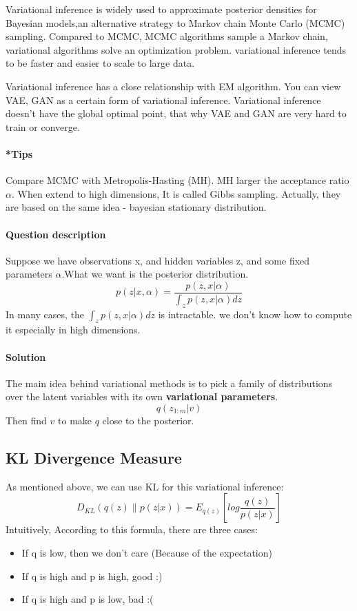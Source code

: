 \documentclass{article}
\begin{document}
Variational inference is widely used to approximate posterior densities for Bayesian models,an alternative strategy to Markov chain Monte Carlo (MCMC) sampling. Compared to MCMC, MCMC algorithms sample a Markov chain, variational algorithms solve an
optimization problem. variational inference tends to be faster and easier to scale to large data.

Variational inference has a close relationship with EM algorithm. You can view VAE, GAN as a certain form of variational inference. Variational inference doesn't have the global optimal point, that why VAE and GAN are very hard to train or converge.
\paragraph{*Tips} Compare MCMC with Metropolis-Hasting (MH). MH larger the acceptance ratio $\alpha$. When extend to high dimensions, It is called Gibbs sampling. Actually, they are based on the same idea - bayesian stationary distribution. 

\paragraph{Question description} Suppose we have observations x, and hidden variables z, and some fixed parameters $\alpha$.What we want is the posterior distribution.
$$p(z|x,\alpha)=\frac{p(z,x|\alpha)}{\int_z p(z,x|\alpha)dz}$$
In many cases, the $\int_z p(z,x|\alpha)dz$ is intractable. we don't know how to compute it especially in high dimensions.
\paragraph{Solution} The main idea behind variational methods is to pick a family of distributions over the latent variables with its own \textbf{variational parameters}.
$$q(z_{1:m}|v)$$
Then find $v$ to make $q$ close to the posterior.
\subsection{KL Divergence Measure}
As mentioned above, we can use KL for this variational inference:
$$D_{KL}(q(z) \parallel p(z|x))=E_{q(z)} \left[ log \frac{q(z)}{p(z|x)} \right]$$
Intuitively, According to this formula, there are three cases:
\begin{itemize}
\item If q is low, then we don't care (Because of the expectation)
\item If q is high and p is high, good :)
\item If q is high and p is low, bad :(
\end{itemize}
\end{document}
